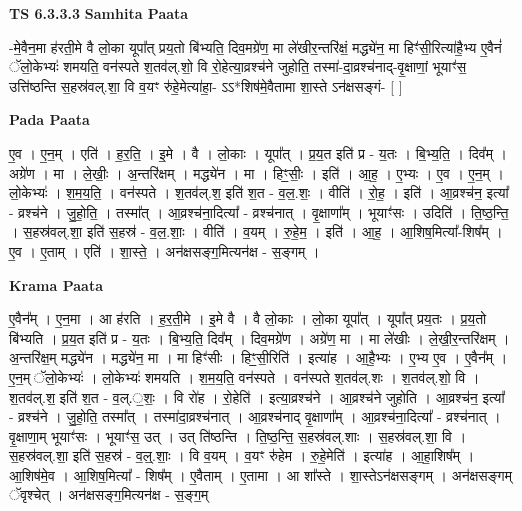 \documentclass[17pt]{extarticle}
\begin{document}
\textbf{TS 6.3.3.3 } \newline
\textbf{Samhita Paata} \newline

-मे॒वैन॒मा ह॑रती॒मे वै लो॒का यूपा᳚त् प्रय॒तो बि॑भ्यति॒ दिव॒मग्रे॑ण॒ मा ले॑खीर॒न्तरि॑क्षं॒ मद्ध्ये॑न॒ मा हिꣳ॑सी॒रित्या॑है॒भ्य ए॒वैनं॑ ॅलो॒केभ्यः॑ शमयति॒ वन॑स्पते श॒तव॑ल्.शो॒ वि रो॒हेत्या॒व्रश्च॑ने जुहोति॒ तस्मा॑-दा॒व्रश्च॑नाद्-वृ॒क्षाणां॒ भूयाꣳ॑स॒ उत्ति॑ष्ठन्ति स॒हस्र॑वल्.शा॒ वि व॒यꣳ रु॑हे॒मेत्या॑हा॒- ऽऽ*शिष॑मे॒वैतामा शा॒स्ते ऽन॑क्षसङ्गं- [  ] \newline

\textbf{Pada Paata} \newline

ए॒व । ए॒न॒म् । एति॑ । ह॒र॒ति॒ । इ॒मे । वै । लो॒काः । यूपा᳚त् । प्र॒य॒त इति॑ प्र - य॒तः । बि॒भ्य॒ति॒ । दिव᳚म् । अग्रे॑ण । मा । ले॒खीः॒ । अ॒न्तरि॑क्षम् । मद्ध्ये॑न । मा । हिꣳ॒॒सीः॒ । इति॑ । आ॒ह॒ । ए॒भ्यः । ए॒व । ए॒न॒म् । लो॒केभ्यः॑ । श॒म॒य॒ति॒ । वन॑स्पते । श॒तव॑ल्.श॒ इति॑ श॒त - व॒ल॒.शः॒ । वीति॑ । रो॒ह॒ । इति॑ । आ॒व्रश्च॑न॒ इत्या᳚ - व्रश्च॑ने । जु॒हो॒ति॒ । तस्मा᳚त् । आ॒व्रश्च॑ना॒दित्या᳚ - व्रश्च॑नात् । वृ॒क्षाणा᳚म् । भूयाꣳ॑सः । उदिति॑ । ति॒ष्ठ॒न्ति॒ । स॒हस्र॑वल्.शा॒ इति॑ स॒हस्र॑ - व॒ल॒.शाः॒ । वीति॑ । व॒यम् । रु॒हे॒म॒ । इति॑ । आ॒ह॒ । आ॒शिष॒मित्या᳚-शिष᳚म् । ए॒व । ए॒ताम् । एति॑ । शा॒स्ते॒ । अन॑क्षसङ्ग॒मित्यन॑क्ष - स॒ङ्गम् ।  \newline


\textbf{Krama Paata} \newline

ए॒वैन᳚म् । ए॒न॒मा । आ ह॑रति । ह॒र॒ती॒मे । इ॒मे वै । वै लो॒काः । लो॒का यूपा᳚त् । यूपा᳚त् प्रय॒तः । प्र॒य॒तो बि॑भ्यति । प्र॒य॒त इति॑ प्र - य॒तः । बि॒भ्य॒ति॒ दिव᳚म् । दिव॒मग्रे॑ण । अग्रे॑ण॒ मा । मा ले॑खीः । ले॒खी॒र॒न्तरि॑क्षम् । अ॒न्तरि॑क्ष॒म् मद्ध्ये॑न । मद्ध्ये॑न॒ मा । मा हिꣳ॑सीः । हिꣳ॒॒सी॒रिति॑ । इत्या॑ह । आ॒है॒भ्यः । ए॒भ्य ए॒व । ए॒वैन᳚म् । ए॒न॒म् ॅलो॒केभ्यः॑ । लो॒केभ्यः॑ शमयति । श॒म॒य॒ति॒ वन॑स्पते । वन॑स्पते श॒तव॑ल्.शः । श॒तव॑ल्.शो॒ वि । श॒तव॑ल्.श॒ इति॑ श॒त - व॒ल्.॒शः॒ । वि रो॑ह । रो॒हेति॑ । इत्या॒व्रश्च॑ने । आ॒व्रश्च॑ने जुहोति । आ॒व्रश्च॑न॒ इत्या᳚ - व्रश्च॑ने । जु॒हो॒ति॒ तस्मा᳚त् । तस्मा॑दा॒व्रश्च॑नात् । आ॒व्रश्च॑नाद् वृ॒क्षाणा᳚म् । आ॒व्रश्च॑ना॒दित्या᳚ - व्रश्च॑नात् । वृ॒क्षाणा॒म् भूयाꣳ॑सः । भूयाꣳ॑स॒ उत् । उत् ति॑ष्ठन्ति । ति॒ष्ठ॒न्ति॒ स॒हस्र॑वल्.शाः । स॒हस्र॑वल्.शा॒ वि । स॒हस्र॑वल्.शा॒ इति॑ स॒हस्र॑ - व॒ल्॒.शाः॒ । वि व॒यम् । व॒यꣳ रु॑हेम । रु॒हे॒मेति॑ । इत्या॑ह । आ॒हा॒शिष᳚म् । आ॒शिष॑मे॒व । आ॒शिष॒मित्या᳚ - शिष᳚म् । ए॒वैताम् । ए॒तामा । आ शा᳚स्ते । शा॒स्तेऽन॑क्षसङ्‍गम् । अन॑क्षसङ्‍गम् ॅवृश्चेत् । अन॑क्षसङ्‍ग॒मित्यन॑क्ष - स॒ङ्‍ग॒म् \newline
\end{document}
